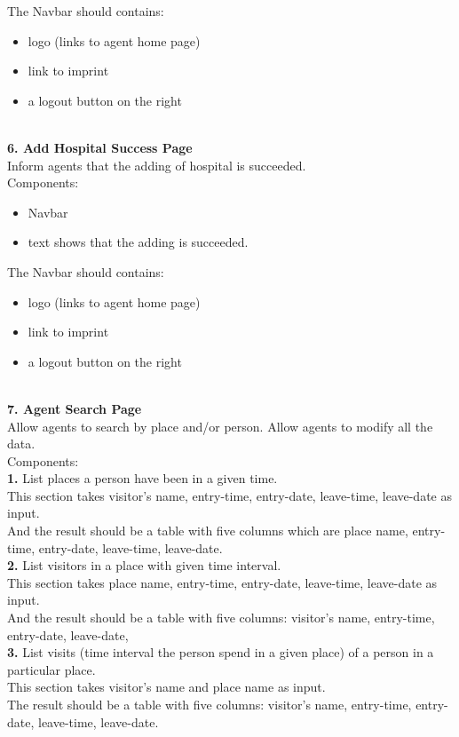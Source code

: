 \documentclass{article}
\begin{document}
The Navbar should contains:
\begin{itemize}
	\item logo (links to agent home page)
	\item link to imprint
	\item a logout button on the right
\end{itemize}
\\
\textbf{6. Add Hospital Success Page}\\
Inform agents that the adding of hospital is succeeded.\\
Components:
\begin{itemize}
	\item Navbar
	\item text shows that the adding is succeeded.
\end{itemize}
The Navbar should contains:
\begin{itemize}
	\item logo (links to agent home page)
	\item link to imprint
	\item a logout button on the right
\end{itemize}
\\
\textbf{7. Agent Search Page}\\
Allow agents to search by place and/or person. Allow agents to modify all the data.\\
Components:\\
\textbf{1.} List places a person have been in a given time.\\
This section takes visitor's name, entry-time, entry-date, leave-time, leave-date as input.\\
And the result should be a table with five columns which are place name, entry-time, entry-date, 
leave-time, leave-date.\\
\textbf{2.} List visitors in a place with given time interval.\\
This section takes place name, entry-time, entry-date, leave-time, leave-date as input.\\
And the result should be a table with five columns: visitor's name, entry-time, entry-date, 
leave-date,\\
\textbf{3.} List visits (time interval the person spend in a given place) of a person in a particular place.\\
This section takes visitor's name and place name as input.\\
The result should be a table with five columns: visitor's name, entry-time, entry-date, leave-time, leave-date.\\
\end{document}
